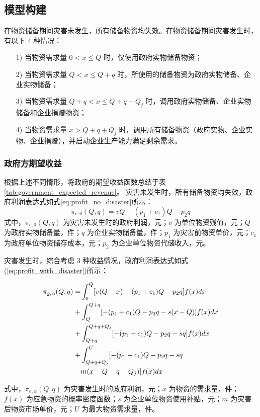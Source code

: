 \documentclass[a4paper,8pt,twocolumn]{article} %
\begin{document}
\subsection{模型构建}
在物资储备期间灾害未发生，所有储备物资均失效。在物资储备期间灾害发生时，有以下 4 种情况：
\begin{enumerate}
    \item[1)] 当物资需求量 $0 < x \leq Q$ 时，仅使用政府实物储备物资；
    \item[2)] 当物资需求量 $Q < x \leq Q + q$ 时，所使用的储备物资为政府实物储备、企业实物储备；
    \item[3)] 当物资需求量 $Q + q < x \leq Q + q + Q_j$ 时，调用政府实物储备、企业实物储备和企业捐赠物资；
    \item[4)] 当物资需求量 $x > Q + q + Q_j$ 时，调用所有储备物资（政府实物、企业实物、企业捐赠），并启动企业生产能力满足剩余需求。
\end{enumerate}

\subsubsection{政府方期望收益}
根据上述不同情形，将政府的期望收益函数总结于表 \ref{tab:government_expected_revenue}。
灾害未发生时，所有储备物资均失效，政府利润表达式如式\ref{eq:profit_no_disaster}所示：
\begin{equation} \label{eq:profit_no_disaster}
\pi_{e,0}(Q,q) = v Q - (p_1 + c_1) Q - p_2 q
\end{equation}
式中，$\pi_{e,0}(Q,q)$ 为灾害未发生时的政府利润，元；$v$ 为单位物资残值，元；$Q$ 为政府实物储备量，件；$q$ 为企业实物储备量，件；$p_1$ 为灾害前物资单价，元；$c_1$ 为政府单位物资储存成本，元；$p_2$ 为企业单位物资代储收入，元。

灾害发生时，综合考虑 3 种收益情况，政府利润表达式如式(\ref{eq:profit_with_disaster})所示：
\begin{small}
\begin{align} \label{eq:profit_with_disaster}
\pi_{g,\alpha}(Q,q) = & \int_0^Q [v(Q-x) - (p_1+c_1)Q - p_2q] f(x)dx \notag \\
+ & \int_Q^{Q+q} [-(p_1+c_1)Q - p_2q - s(x-Q)] f(x)dx \notag \\
+ & \int_{Q+q}^{Q+q+Q_j} [-(p_1+c_1)Q - p_2q - sq] f(x)dx \notag \\
+ & \int_{Q+q+Q_j}^U [-(p_1+c_1)Q - p_2q - sq \notag \\
- & m(x-Q-q-Q_j)] f(x)dx
\end{align}
\end{small}
式中，$\pi_{e,\alpha}(Q,q)$ 为灾害发生时的政府利润，元；$x$ 为物资的需求量，件；$f(x)$ 为应急物资的概率密度函数；$s$ 为企业单位物资使用补贴，元；$m$ 为灾害后物资市场单价，元；$U$ 为最大物资需求量，件。
\end{document}
